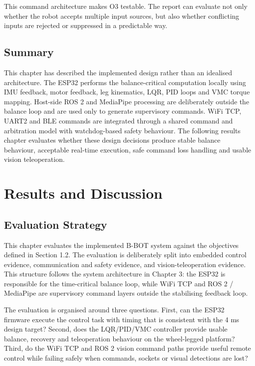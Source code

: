 \documentclass[12pt, a4paper]{article}
\begin{document}
This command architecture makes O3 testable. The report can evaluate not only whether the robot accepts multiple input sources, but also whether conflicting inputs are rejected or suppressed in a predictable way.

\subsection{Summary}

This chapter has described the implemented design rather than an idealised architecture. The ESP32 performs the balance-critical computation locally using IMU feedback, motor feedback, leg kinematics, LQR, PID loops and VMC torque mapping. Host-side ROS 2 and MediaPipe processing are deliberately outside the balance loop and are used only to generate supervisory commands. WiFi TCP, UART2 and BLE commands are integrated through a shared command and arbitration model with watchdog-based safety behaviour. The following results chapter evaluates whether these design decisions produce stable balance behaviour, acceptable real-time execution, safe command loss handling and usable vision teleoperation.



\section{Results and Discussion}

\subsection{Evaluation Strategy}

This chapter evaluates the implemented B-BOT system against the objectives defined in Section 1.2. The evaluation is deliberately split into embedded control evidence, communication and safety evidence, and vision-teleoperation evidence. This structure follows the system architecture in Chapter 3: the ESP32 is responsible for the time-critical balance loop, while WiFi TCP and ROS 2 / MediaPipe are supervisory command layers outside the stabilising feedback loop.

The evaluation is organised around three questions. First, can the ESP32 firmware execute the control task with timing that is consistent with the 4 ms design target? Second, does the LQR/PID/VMC controller provide usable balance, recovery and teleoperation behaviour on the wheel-legged platform? Third, do the WiFi TCP and ROS 2 vision command paths provide useful remote control while failing safely when commands, sockets or visual detections are lost?
\end{document}
